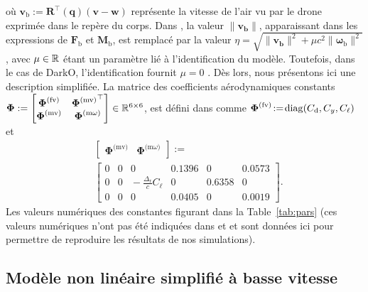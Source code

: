 où $\boldsymbol{v}_{\text{b}} := \boldsymbol{R}^\top(\boldsymbol{q}) (\boldsymbol{v}-\boldsymbol{w})$ représente la vitesse de l'air vu par le drone exprimée dans le repère du corps. Dans \cite{lustosaHal-03035938}, la valeur $\lVert \boldsymbol{v_{\text{b}}} \rVert$, apparaissant dans les expressions de  $\boldsymbol{F}_{\text{b}}$ et $\boldsymbol{M}_{\text{b}}$, est remplacé par la valeur $\eta = \sqrt{\lVert \boldsymbol{v_{\text{b}}} \rVert^{2} + \mu c^{2} \lVert \boldsymbol{\omega}_{\text{b}} \rVert^{2}}$, avec $\mu \in {\mathbb R}$ étant un paramètre lié à l'identification du modèle. Toutefois, dans le cas de DarkO, l'identification fournit $\mu = 0$ \cite{sansouStage}. Dès lors, nous présentons ici une description simplifiée. La matrice des coefficients aérodynamiques constants 
$\boldsymbol{\Phi}:= \begin{bmatrix} \boldsymbol{\Phi}^{\text{(fv)}} & {\boldsymbol{\Phi}^{\text{(mv)}}}^\top \\ \boldsymbol{\Phi}^{\text{(mv)}} & \boldsymbol{\Phi}^{\text{(m$\omega$)}} \end{bmatrix} \in {\mathbb R}^{6 \times 6}$, est défini dans \cite[eqs. (6)--(9)]{olszaneckibarthHal-02542982} comme $ \boldsymbol{\Phi}^{\text{(fv)}} \!:=\! \operatorname{diag}(C_{\text{d}},C_{y}, C_{\ell})$ et
\begin{align*}
&\left[ \begin{array}{c|c}
    \boldsymbol{\Phi}^{\text{(mv)}}  &  \boldsymbol{\Phi}^{\text{(m$\omega$)}} 
\end{array}\right] :=\\ 
&\left[ \begin{array}{ccc|ccc}
    0 & 0 & 0    &                                          0.1396 & 0 & 0.0573 \\
    0 & 0 & \!\!\!\!\! -\frac{\Delta_{\text{r}}}{c}C_{\ell} &    0 &  0.6358  & 0 \\
    0 & 0 & 0 &     0.0405 & 0 & 0.0019 
\end{array}\right].
\end{align*}
Les valeurs numériques des constantes figurant dans la Table~\ref{tab:pars} (ces valeurs numériques n'ont pas été indiquées dans \cite{lustosaHal-03035938} et \cite{olszaneckibarthHal-02542982} et sont données ici pour permettre de reproduire les résultats de nos simulations). 


\subsection{Modèle non linéaire simplifié à basse vitesse}
\label{sec:model_NL_simp}

